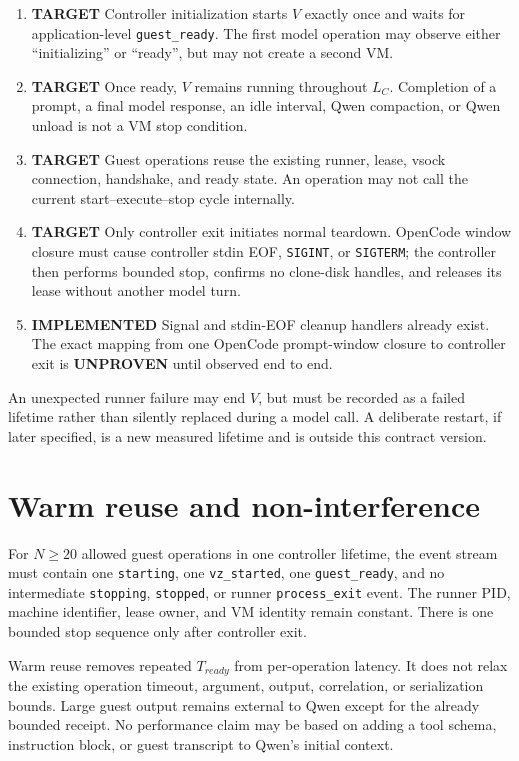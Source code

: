 \documentclass[10pt]{article}
\newcommand{\Implemented}{\textcolor{implemented}{\textbf{IMPLEMENTED}}}
\newcommand{\Target}{\textcolor{target}{\textbf{TARGET}}}
\newcommand{\Unproven}{\textcolor{unproven}{\textbf{UNPROVEN}}}
\newcommand{\code}[1]{\texttt{#1}}
\begin{document}
\begin{enumerate}
  \item \Target{} Controller initialization starts \(V\) exactly once and waits
        for application-level \code{guest\_ready}.  The first model operation
        may observe either ``initializing'' or ``ready'', but may not create a
        second VM.
  \item \Target{} Once ready, \(V\) remains running throughout \(L_C\).
        Completion of a prompt, a final model response, an idle interval, Qwen
        compaction, or Qwen unload is not a VM stop condition.
  \item \Target{} Guest operations reuse the existing runner, lease, vsock
        connection, handshake, and ready state.  An operation may not call the
        current start--execute--stop cycle internally.
  \item \Target{} Only controller exit initiates normal teardown.  OpenCode
        window closure must cause controller stdin EOF, \code{SIGINT}, or
        \code{SIGTERM}; the controller then performs bounded stop, confirms no
        clone-disk handles, and releases its lease without another model turn.
  \item \Implemented{} Signal and stdin-EOF cleanup handlers already exist.
        The exact mapping from one OpenCode prompt-window closure to controller
        exit is \Unproven{} until observed end to end.
\end{enumerate}

An unexpected runner failure may end \(V\), but must be recorded as a failed
lifetime rather than silently replaced during a model call.  A deliberate
restart, if later specified, is a new measured lifetime and is outside this
contract version.

\section{Warm reuse and non-interference}

For \(N\geq20\) allowed guest operations in one controller lifetime, the event
stream must contain one \code{starting}, one \code{vz\_started}, one
\code{guest\_ready}, and no intermediate \code{stopping}, \code{stopped}, or
runner \code{process\_exit} event.  The runner PID, machine identifier, lease
owner, and VM identity remain constant.  There is one bounded stop sequence only
after controller exit.

Warm reuse removes repeated \(T_{ready}\) from per-operation latency.  It does
not relax the existing operation timeout, argument, output, correlation, or
serialization bounds.  Large guest output remains external to Qwen except for
the already bounded receipt.  No performance claim may be based on adding a
tool schema, instruction block, or guest transcript to Qwen's initial context.
\end{document}
